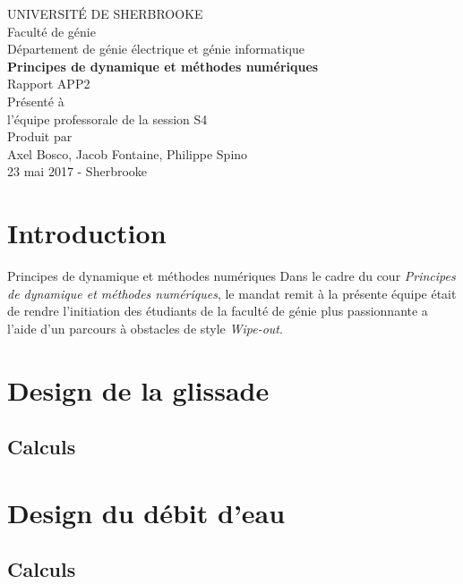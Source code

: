 \documentclass[12pt]{article}
\begin{document}
\begin{titlepage} 
	\large
	{
		\begin{center}
			UNIVERSITÉ DE SHERBROOKE\\Faculté de génie\\
			Département de génie électrique et génie informatique\\
			\vspace{3cm}
			{\LARGE\textbf{Principes de dynamique et méthodes numériques}}\\
			\vspace{2cm}
			\LARGE{Rapport APP2}\\
			\vspace{2cm}
			Présenté à\\l'équipe professorale de la session S4\\
			\vspace{2cm}
			Produit par\\Axel Bosco, Jacob Fontaine, Philippe Spino\\
			\vspace{1cm}
			\vfill{23 mai 2017 - Sherbrooke}
		\end{center}
	}
\end{titlepage}
\tableofcontents
\newpage
\section{Introduction}
Principes de dynamique et méthodes numériques
Dans le cadre du cour \textit{Principes de dynamique et méthodes numériques}, le mandat remit à la présente équipe était de rendre l'initiation des étudiants de la faculté de génie plus passionnante a l'aide d'un parcours à obstacles de style \textit{Wipe-out}.

\section{Design de la glissade}
\subsection{Calculs}

\section{Design du débit d'eau}
\subsection{Calculs}
\end{document}
